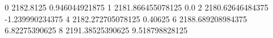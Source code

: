 0 2182.8125 0.946044921875
1 2181.866455078125 0.0
2 2180.62646484375 -1.239990234375
4 2182.272705078125 0.40625
6 2188.689208984375 6.82275390625
8 2191.38525390625 9.518798828125
